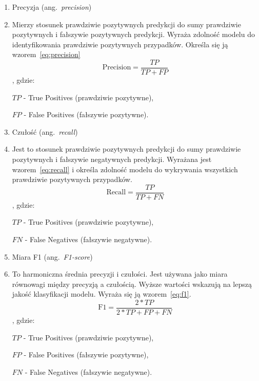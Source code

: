 \begin{enumerate}[label={\alph*)}]
    \item Precyzja (ang.~\emph{precision})
    \item [] Mierzy stosunek prawdziwie pozytywnych predykcji do sumy prawdziwie pozytywnych i  fałszywie pozytywnych predykcji.
Wyraża zdolność modelu do identyfikowania prawdziwie pozytywnych przypadków.
Określa się ją wzorem~\ref{eq:precision}
      \begin{equation}
        \text{Precision} = \frac{TP}{TP + FP}\label{eq:precision}
    \end{equation}
    , gdzie:

\quad$TP$ - True Positives (prawdziwie pozytywne),

\quad$FP$ - False Positives (fałszywie pozytywne).

    \item Czułość (ang.~\emph{recall})
    \item [] Jest to stosunek prawdziwie pozytywnych predykcji do sumy prawdziwie pozytywnych i fałszywie negatywnych predykcji.
Wyrażana jest wzorem~\ref{eq:recall} i określa zdolność modelu do wykrywania wszystkich prawdziwie pozytywnych przypadków.
    \begin{equation}
        \text{Recall} = \frac{TP}{TP + FN}\label{eq:recall}
    \end{equation}
    , gdzie:

\quad$TP$ - True Positives (prawdziwie pozytywne),

\quad$FN$ - False Negatives (fałszywie negatywne).

    \item Miara F1 (ang.~\emph{F1-score})
    \item [] To harmoniczna średnia precyzji i czułości.
Jest używana jako miara równowagi między precyzją a czułością.
Wyższe wartości wskazują na lepszą jakość klasyfikacji modelu.
Wyraża się ją wzorem~\ref{eq:f1}.
  \begin{equation}
        \text{F1} = \frac{2 * TP}{2 * TP + FP + FN}\label{eq:f1}
    \end{equation}
        , gdzie:

\quad$TP$ - True Positives (prawdziwie pozytywne),

\quad$FP$ - False Positives (fałszywie pozytywne),

\quad$FN$ - False Negatives (fałszywie negatywne).

\end{enumerate}